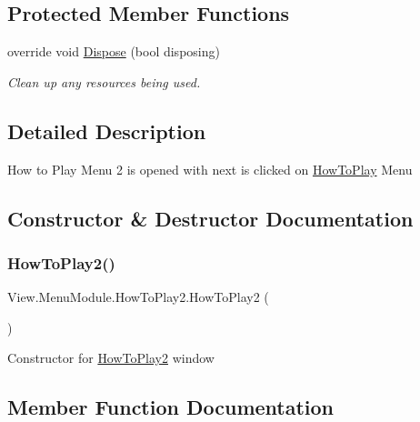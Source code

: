 \subsection*{Protected Member Functions}
\begin{DoxyCompactItemize}
\item 
override void \hyperlink{class_view_1_1_menu_module_1_1_how_to_play2_a697ecda1f98ad4557b3789a36a2c5a8e}{Dispose} (bool disposing)
\begin{DoxyCompactList}\small\item\em Clean up any resources being used. \end{DoxyCompactList}\end{DoxyCompactItemize}


\subsection{Detailed Description}
How to Play Menu 2 is opened with next is clicked on \hyperlink{class_view_1_1_menu_module_1_1_how_to_play}{How\+To\+Play} Menu 



\subsection{Constructor \& Destructor Documentation}
\hypertarget{class_view_1_1_menu_module_1_1_how_to_play2_ac0069718a15c08929de5228baef2b805}{}\label{class_view_1_1_menu_module_1_1_how_to_play2_ac0069718a15c08929de5228baef2b805} 
\subsubsection{\texorpdfstring{How\+To\+Play2()}{HowToPlay2()}}
{\footnotesize\ttfamily View.\+Menu\+Module.\+How\+To\+Play2.\+How\+To\+Play2 (\begin{DoxyParamCaption}{ }\end{DoxyParamCaption})\hspace{0.3cm}{\ttfamily [inline]}}

Constructor for \hyperlink{class_view_1_1_menu_module_1_1_how_to_play2}{How\+To\+Play2} window 

\subsection{Member Function Documentation}
\hypertarget{class_view_1_1_menu_module_1_1_how_to_play2_a697ecda1f98ad4557b3789a36a2c5a8e}{}\label{class_view_1_1_menu_module_1_1_how_to_play2_a697ecda1f98ad4557b3789a36a2c5a8e} 
